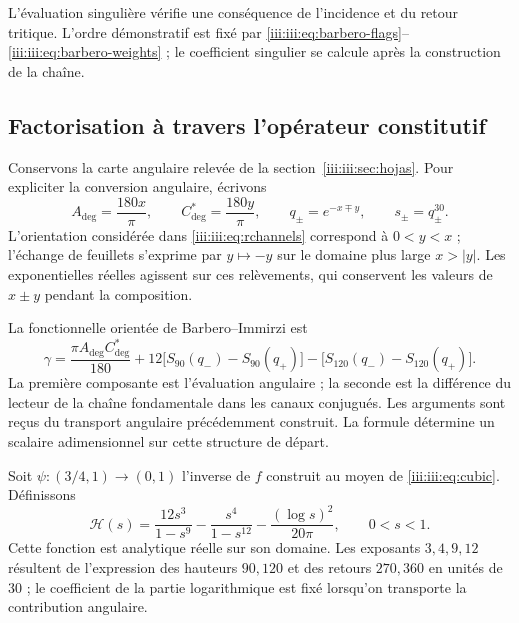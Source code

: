 L’évaluation singulière vérifie une conséquence de l’incidence et du
retour tritique. L’ordre démonstratif est fixé par
\eqref{iii:iii:eq:barbero-flags}--\eqref{iii:iii:eq:barbero-weights} ; le
coefficient singulier se calcule après la construction de la chaîne.

\subsection{Factorisation à travers l’opérateur constitutif}

Conservons la carte angulaire relevée de la
section~\ref{iii:iii:sec:hojas}. Pour expliciter la conversion angulaire,
écrivons
\begin{equation}
 A_{\deg}=\frac{180x}{\pi},\qquad
 C^*_{\deg}=\frac{180y}{\pi},\qquad
 q_\pm=e^{-x\mp y},\qquad s_\pm=q_\pm^{30}.
 \label{iii:iii:eq:barbero-angular-lift}
\end{equation}
L’orientation considérée dans \eqref{iii:iii:eq:rchannels} correspond à
$0<y<x$ ; l’échange de feuillets s’exprime par $y\mapsto-y$ sur le
domaine plus large $x>|y|$. Les exponentielles réelles agissent sur ces
relèvements, qui conservent les valeurs de $x\pm y$ pendant la
composition.

La fonctionnelle orientée de Barbero--Immirzi est
\begin{equation}
 \gamma=\frac{\pi A_{\deg}C^*_{\deg}}{180}
   +12\bigl[S_{90}(q_-)-S_{90}(q_+)\bigr]
   -\bigl[S_{120}(q_-)-S_{120}(q_+)\bigr].
 \label{iii:iii:eq:barbero-functional}
\end{equation}
La première composante est l’évaluation angulaire ; la seconde est la
différence du lecteur de la chaîne fondamentale dans les canaux conjugués.
Les arguments sont reçus du transport angulaire précédemment construit.
La formule détermine un scalaire adimensionnel sur cette structure de
départ.

Soit $\psi:(3/4,1)\to(0,1)$ l’inverse de $f$ construit au moyen de
\eqref{iii:iii:eq:cubic}. Définissons
\begin{equation}
 \mathcal H(s)=\frac{12s^3}{1-s^9}
             -\frac{s^4}{1-s^{12}}
             -\frac{(\log s)^2}{20\pi},\qquad 0<s<1.
 \label{iii:iii:eq:barbero-h}
\end{equation}
Cette fonction est analytique réelle sur son domaine. Les exposants $3,4,9,12$
résultent de l’expression des hauteurs $90,120$ et des retours $270,360$ en
unités de $30$ ; le coefficient de la partie logarithmique est fixé lorsqu’on
transporte la contribution angulaire.

